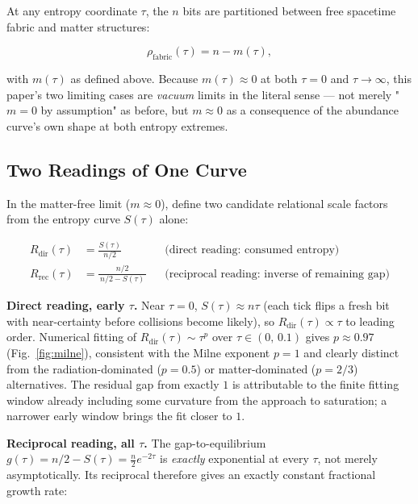 \documentclass[11pt]{article}
\begin{document}
At any entropy coordinate $\tau$, the $n$ bits are partitioned between
free spacetime fabric and matter structures:

\begin{equation}
  \rho_{\text{fabric}}(\tau) = n - m(\tau),
  \label{eq:conservation}
\end{equation}

with $m(\tau)$ as defined above. Because $m(\tau)\approx 0$ at both
$\tau=0$ and $\tau\to\infty$, this paper's two limiting cases are
\emph{vacuum} limits in the literal sense --- not merely "$m=0$ by
assumption" as before, but $m\approx 0$ as a consequence of the
abundance curve's own shape at both entropy extremes.

\subsection{Two Readings of One Curve}
\label{sec:tworeadings}

In the matter-free limit ($m\approx0$), define two candidate relational
scale factors from the entropy curve $S(\tau)$ alone:

\begin{align}
  R_{\text{dir}}(\tau) &= \frac{S(\tau)}{n/2}
    &&\text{(direct reading: consumed entropy)}
    \label{eq:Rdir}\\[4pt]
  R_{\text{rec}}(\tau) &= \frac{n/2}{\,n/2 - S(\tau)\,}
    &&\text{(reciprocal reading: inverse of remaining gap)}
    \label{eq:Rrec}
\end{align}

\textbf{Direct reading, early $\tau$.} Near $\tau=0$, $S(\tau)\approx
n\tau$ (each tick flips a fresh bit with near-certainty before
collisions become likely), so $R_{\text{dir}}(\tau)\propto\tau$ to
leading order. Numerical fitting of $R_{\text{dir}}(\tau)\sim\tau^{p}$
over $\tau\in(0,\,0.1)$ gives $p\approx0.97$ (Fig.~\ref{fig:milne}),
consistent with the Milne exponent $p=1$ and clearly distinct from the
radiation-dominated ($p=0.5$) or matter-dominated ($p=2/3$)
alternatives. The residual gap from exactly $1$ is attributable to the
finite fitting window already including some curvature from the
approach to saturation; a narrower early window brings the fit closer
to $1$.

\textbf{Reciprocal reading, all $\tau$.} The gap-to-equilibrium
$g(\tau) = n/2 - S(\tau) = \tfrac{n}{2}e^{-2\tau}$ is \emph{exactly}
exponential at every $\tau$, not merely asymptotically. Its reciprocal
therefore gives an exactly constant fractional growth rate:
\end{document}
